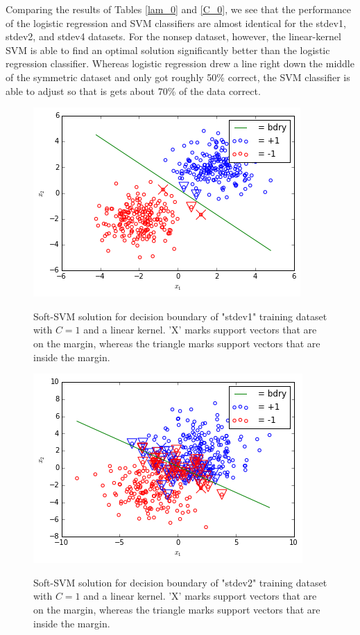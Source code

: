\documentclass[10pt]{article}
\begin{document}
Comparing the results of Tables \ref{lam_0} and \ref{C_0}, we see that the performance of the logistic regression and SVM classifiers are almost identical for the stdev1, stdev2, and stdev4 datasets.  For the nonsep dataset, however, the linear-kernel SVM is able to find an optimal solution significantly better than the logistic regression classifier.  Whereas logistic regression drew a line right down the middle of the symmetric dataset and only got roughly 50\% correct, the SVM classifier is able to adjust so that is gets about 70\% of the data correct.

\begin{figure}
\centering
\includegraphics[scale=0.5]{svm_stdev1_train.png}
\label{svm_stdev1}
\caption{Soft-SVM solution for decision boundary of "stdev1" training dataset with $C=1$ and a linear kernel.  'X' marks support vectors that are on the margin, whereas the triangle marks support vectors that are inside the margin.}
\end{figure}
\begin{figure}
\centering
\includegraphics[scale=0.5]{svm_stdev2_train.png}
\label{svm_stdev2}
\caption{Soft-SVM solution for decision boundary of "stdev2" training dataset with $C=1$ and a linear kernel.  'X' marks support vectors that are on the margin, whereas the triangle marks support vectors that are inside the margin.}
\end{figure}
\end{document}
